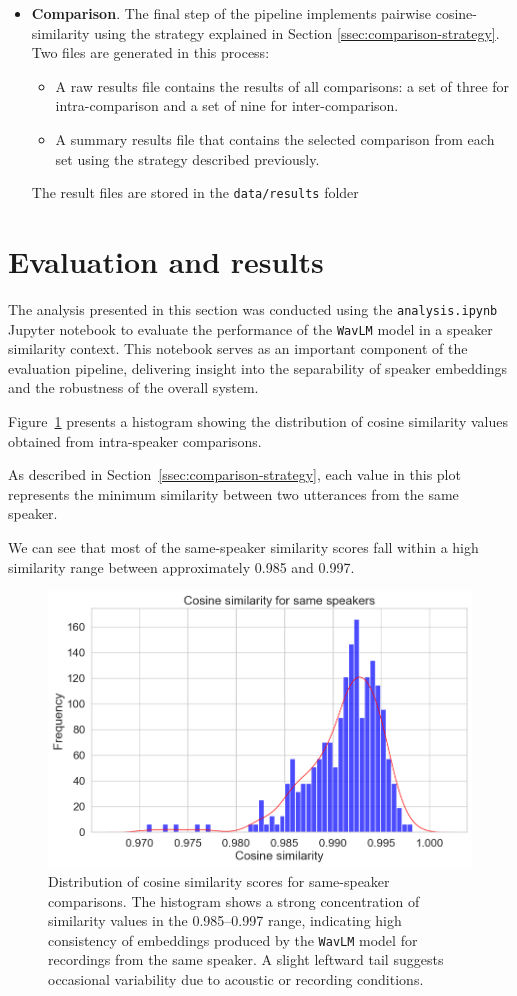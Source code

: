 \documentclass[conference]{IEEEtran}
\begin{document}
\begin{itemize}
	\item \textbf{Comparison}. The final step of the pipeline implements pairwise cosine-similarity using the strategy explained in Section \ref{ssec:comparison-strategy}. Two files are generated in this process:
	\begin{itemize}
		\item A raw results file contains the results of all comparisons: a set of three for intra-comparison and a set of nine for inter-comparison.
		\item A summary results file that contains the selected comparison from each set using the strategy described previously.
	\end{itemize}
	The result files are stored in the \texttt{data/results} folder
\end{itemize}

\section{Evaluation and results}
\label{scn:evaluation-and-results}

The analysis presented in this section was conducted using the \texttt{analysis.ipynb} Jupyter notebook to evaluate the performance of the \texttt{WavLM} model in a speaker similarity context. 
This notebook serves as an important component of the evaluation pipeline, delivering insight into the separability of speaker embeddings and the robustness of the overall system.

Figure~\ref{fig:img-self-similarity} presents a histogram showing the distribution of cosine similarity values obtained from intra-speaker comparisons.

As described in Section~\ref{ssec:comparison-strategy}, each value in this plot represents the minimum similarity between two utterances from the same speaker.

We can see that most of the same-speaker similarity scores fall within a high similarity range between approximately 0.985 and 0.997. 

\begin{figure}[H]
	\centering
	\includegraphics[width=0.7\linewidth]{img/img-self-similarity}
	\caption{Distribution of cosine similarity scores for same-speaker comparisons. The histogram shows a strong concentration of similarity values in the 0.985–0.997 range, indicating high consistency of embeddings produced by the \texttt{WavLM} model for recordings from the same speaker. A slight leftward tail suggests occasional variability due to acoustic or recording conditions.}
	\label{fig:img-self-similarity}
\end{figure}
\end{document}
